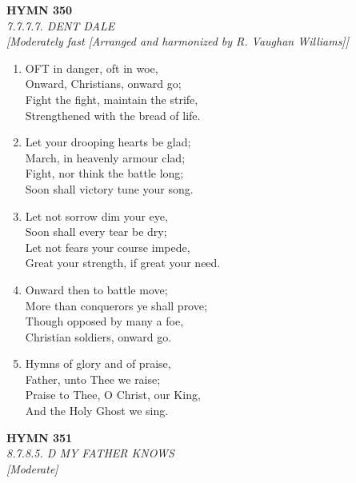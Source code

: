 \documentclass[11pt,a4paper]{article}
\begin{document}
\newpage
\begin{center}
    {\Large \textbf{HYMN 350}}
    \\
    \textit{7.7.7.7. DENT DALE}
    \\
    \textit{\small [Moderately fast [Arranged and harmonized by R. Vaughan Williams]]}
\end{center}
\vspace{1em}

\begin{enumerate}
    \item OFT in danger, oft in woe, \\
        Onward, Christians, onward go; \\
        Fight the fight, maintain the strife, \\
        Strengthened with the bread of life.

    \item Let your drooping hearts be glad; \\
        March, in heavenly armour clad; \\
        Fight, nor think the battle long; \\
        Soon shall victory tune your song.

    \item Let not sorrow dim your eye, \\
        Soon shall every tear be dry; \\
        Let not fears your course impede, \\
        Great your strength, if great your need.

    \item Onward then to battle move; \\
        More than conquerors ye shall prove; \\
        Though opposed by many a foe, \\
        Christian soldiers, onward go.

    \item Hymns of glory and of praise, \\
        Father, unto Thee we raise; \\
        Praise to Thee, O Christ, our King, \\
        And the Holy Ghost we sing.

\end{enumerate}

\newpage
\begin{center}
    {\Large \textbf{HYMN 351}}
    \\
    \textit{8.7.8.5. D MY FATHER KNOWS}
    \\
    \textit{\small [Moderate]}
\end{center}
\vspace{1em}
\end{document}
